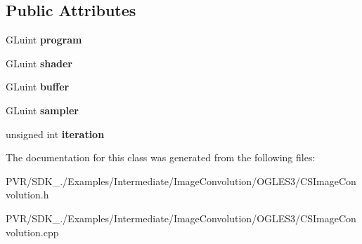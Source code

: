 \subsection*{Public Attributes}
\begin{DoxyCompactItemize}
\item 
\hypertarget{class_convolution_shader_a8c9962191b25d170ecd5c4fc68ada505}{G\+Luint {\bfseries program}}\label{class_convolution_shader_a8c9962191b25d170ecd5c4fc68ada505}

\item 
\hypertarget{class_convolution_shader_a2b7e9feb1c9995d75e3c8ebea87c773b}{G\+Luint {\bfseries shader}}\label{class_convolution_shader_a2b7e9feb1c9995d75e3c8ebea87c773b}

\item 
\hypertarget{class_convolution_shader_a4216a100fcb939087b7002c515de0b6b}{G\+Luint {\bfseries buffer}}\label{class_convolution_shader_a4216a100fcb939087b7002c515de0b6b}

\item 
\hypertarget{class_convolution_shader_a5b5e505ba4574eaf9d4441945ab871ff}{G\+Luint {\bfseries sampler}}\label{class_convolution_shader_a5b5e505ba4574eaf9d4441945ab871ff}

\item 
\hypertarget{class_convolution_shader_a881acdd749bbc5dc2808898bedc3c82d}{unsigned int {\bfseries iteration}}\label{class_convolution_shader_a881acdd749bbc5dc2808898bedc3c82d}

\end{DoxyCompactItemize}


The documentation for this class was generated from the following files\+:\begin{DoxyCompactItemize}
\item 
P\+V\+R/\+S\+D\+K\+\_./\+Examples/\+Intermediate/\+Image\+Convolution/\+O\+G\+L\+E\+S3/C\+S\+Image\+Convolution.\+h\item 
P\+V\+R/\+S\+D\+K\+\_./\+Examples/\+Intermediate/\+Image\+Convolution/\+O\+G\+L\+E\+S3/C\+S\+Image\+Convolution.\+cpp\end{DoxyCompactItemize}
